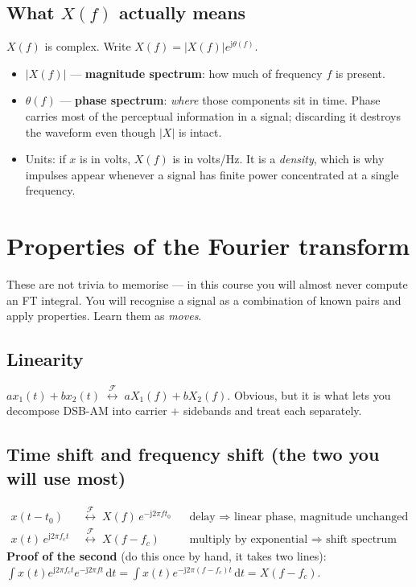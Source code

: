 \documentclass[11pt,a4paper]{article}
\newcommand{\FT}{\;\stackrel{\mathcal{F}}{\longleftrightarrow}\;}
\newcommand{\dd}{\,\mathrm{d}}
\newcommand{\ii}{\mathrm{j}}
\begin{document}
\subsection{What $X(f)$ actually means}
$X(f)$ is complex. Write $X(f)=|X(f)|e^{\ii\theta(f)}$.
\begin{itemize}[nosep,leftmargin=*]
\item $|X(f)|$ --- \textbf{magnitude spectrum}: how much of frequency $f$ is present.
\item $\theta(f)$ --- \textbf{phase spectrum}: \emph{where} those components sit in time. Phase carries most
of the perceptual information in a signal; discarding it destroys the waveform even though $|X|$ is intact.
\item Units: if $x$ is in volts, $X(f)$ is in volts/Hz. It is a \emph{density}, which is why impulses appear
whenever a signal has finite power concentrated at a single frequency.
\end{itemize}

\section{Properties of the Fourier transform}

These are not trivia to memorise --- in this course you will almost never compute an FT integral. You will
recognise a signal as a combination of known pairs and apply properties. Learn them as \emph{moves}.

\subsection{Linearity}
$a x_1(t)+b x_2(t)\FT aX_1(f)+bX_2(f)$. Obvious, but it is what lets you decompose DSB-AM into
carrier + sidebands and treat each separately.

\subsection{Time shift and frequency shift (the two you will use most)}
\begin{align}
x(t-t_0)&\FT X(f)\,e^{-\ii2\pi ft_0} &&\text{delay $\Rightarrow$ linear phase, magnitude unchanged}\\
x(t)\,e^{\ii2\pi f_ct}&\FT X(f-f_c) &&\text{multiply by exponential $\Rightarrow$ shift spectrum}
\end{align}
\textbf{Proof of the second} (do this once by hand, it takes two lines):
$\int x(t)e^{\ii2\pi f_ct}e^{-\ii2\pi ft}\dd t=\int x(t)e^{-\ii2\pi(f-f_c)t}\dd t=X(f-f_c)$.
\end{document}
